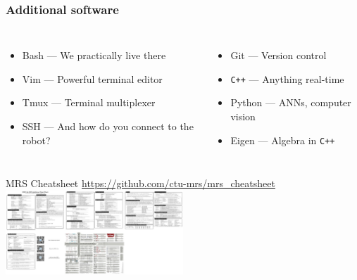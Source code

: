 \documentclass[aspectratio=169]{beamer}
\begin{document}

\begin{frame}
\frametitle{Additional software}

\begin{columns}[c]

\begin{itemize}
  \small \item Bash --- We practically live there
  \small \item Vim --- Powerful terminal editor
  \small \item Tmux --- Terminal multiplexer
  \small \item SSH --- And how do you connect to the robot?
\end{itemize}

\begin{itemize}
  \small \item Git --- Version control
  \small \item \texttt{C++} --- Anything real-time
  \small \item Python --- ANNs, computer vision
  \small \item Eigen --- Algebra in \texttt{C++}
\end{itemize}

\end{columns}

  \begin{block}{MRS Cheatsheet}
    \centering
    \Large\url{https://github.com/ctu-mrs/mrs_cheatsheet}
    \includegraphics[width=0.5\textwidth]{./fig/cheatsheet.jpg}
  \end{block}

\end{frame}


\end{document}
